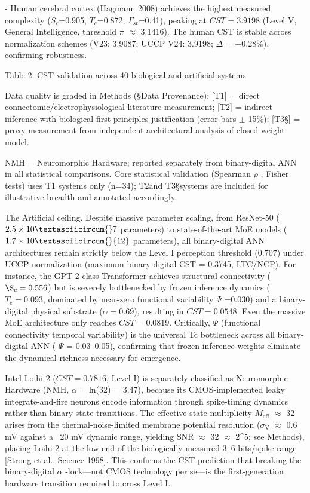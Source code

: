 \documentclass[a4paper,12pt]{article}
\begin{document}
- Human cerebral cortex (Hagmann 2008) achieves the highest measured complexity ($S_{c}$=0.905, $T_{c}$=0.872, $\Gamma_{st}$=0.41), peaking at $CST = 3.9198$ (Level V, General Intelligence, threshold  $\pi$   $\approx$  3.1416). The human CST is stable across normalization schemes (V23: 3.9087; UCCP V24: 3.9198; $\Delta$ = +0.28\%), confirming robustness.

Table 2. CST validation across 40 biological and artificial systems.

Data quality is graded in Methods (\S{}Data Provenance): [T1] = direct connectomic/electrophysiological literature measurement; [T2\dag] = indirect inference with biological first-principles justification (error bars  $\pm$ 15\%); [T3\S] = proxy measurement from independent architectural analysis of closed-weight model.

\dag{}NMH = Neuromorphic Hardware; reported separately from binary-digital ANN in all statistical comparisons. Core statistical validation (Spearman  $\rho$ , Fisher tests) uses T1 systems only (n=34); T2\dag and T3\S systems are included for illustrative breadth and annotated accordingly.

The Artificial ceiling.
Despite massive parameter scaling, from ResNet-50 ($2.5 \times 10\textasciicircum{}7$ parameters) to state-of-the-art MoE models ($1.7 \times 10\textasciicircum{}{12}$ parameters), all binary-digital ANN architectures remain strictly below the Level I perception threshold ($0.707$) under UCCP normalization (maximum binary-digital CST = 0.3745, LTC/NCP).
For instance, the GPT-2 class Transformer achieves structural connectivity ($\S_{\text{c}}=0.556$) but is severely bottlenecked by frozen inference dynamics ($T_{\text{c}}=0.093$, dominated by near-zero functional variability  $\Psi$ =0.030) and a binary-digital physical substrate ($\alpha$$=0.69$), resulting in $CST = 0.0548$.
Even the massive MoE architecture only reaches $CST = 0.0819$.
Critically,  $\Psi$  (functional connectivity temporal variability) is the universal Tc bottleneck across all binary-digital ANN ( $\Psi$  = 0.03--0.05), confirming that frozen inference weights eliminate the dynamical richness necessary for emergence.

Intel Loihi-2 ($CST = 0.7816$, Level I) is separately classified as Neuromorphic Hardware (NMH,  $\alpha$  = ln(32) = 3.47), because its CMOS-implemented leaky integrate-and-fire neurons encode information through spike-timing dynamics rather than binary state transitions.
The effective state multiplicity $M_{\text{eff}}$  $\approx$  32 arises from the thermal-noise-limited membrane potential resolution ($\sigma_{\text{V}}$  $\approx$  0.6 mV against a ~20 mV dynamic range, yielding SNR  $\approx$  32  $\approx$  2^5; see Methods), placing Loihi-2 at the low end of the biologically measured 3--6 bits/spike range [Strong et al., Science 1998].
This confirms the CST prediction that breaking the binary-digital  $\alpha$ -lock---not CMOS technology per se---is the first-generation hardware transition required to cross Level I.
\end{document}

